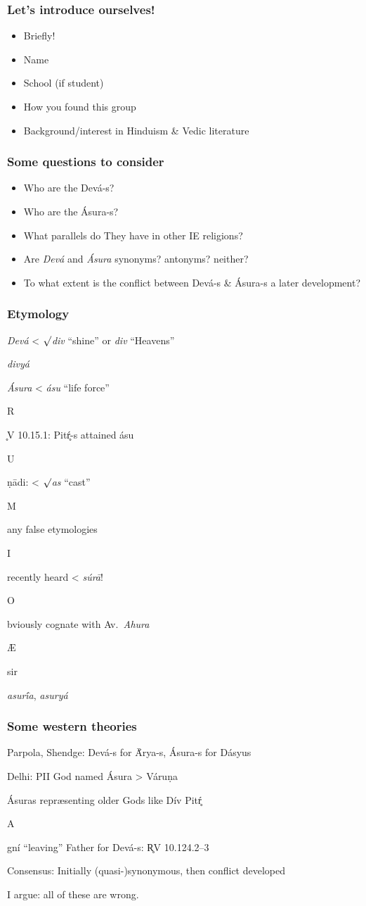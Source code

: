 \documentclass[pdf]{beamer}
\newcommand{\Subitem}[1]{{\setlength\itemindent{12pt} \item[-] #1}}
\newcommand{\Subsubitem}[1]{{\setlength\itemindent{24pt} \item[○] #1}}
\begin{document}
\begin{frame} \frametitle{Let's introduce ourselves!}
\begin{itemize}
	\item Briefly!
	\item Name
	\item School (if student)
	\item How you found this group
	\item Background/interest in Hinduism \& Vedic literature
\end{itemize}
\end{frame}

\begin{frame}[label=questions] \frametitle{Some questions to consider}
\begin{itemize}
	\item Who are the Devá-s?
	\item Who are the Ásura-s?
	\item What parallels do They have in other IE religions?
	\item Are \textit{Devá} and \textit{Ásura} synonyms? antonyms? neither?
	\item To what extent is the conflict between Devá-s \& Ásura-s a later development?
\end{itemize}
\end{frame}

\begin{frame} \frametitle{Etymology}
\begin{itemize}
	\item \textit{Devá} < $\surd$\textit{div} ``shine'' or \textit{div} ``Heavens''
	\Subitem {\textit{divyá}}
	\item \textit{Ásura} < \textit{ásu} ``life force''
	\Subitem R̥V 10.15.1: Pitŕ̥-s attained ásu
	\Subitem Uṇādi: < $\surd$\textit{as} ``cast''
	\Subitem Many false etymologies
	\Subsubitem I recently heard < \textit{súrā}!
	\Subitem Obviously cognate with Av.~\textit{Ahura}
	\Subsubitem Æsir
	\Subitem {\textit{asurī́a}, \textit{asuryá}}
\end{itemize}
\end{frame}

\begin{frame} \frametitle{Some western theories}
\begin{itemize}
	\item Parpola, Shendge: Devá-s for Ā́rya-s, Ásura-s for Dásyus
	\item Delhi: PII God named Ásura > Váruṇa
	\item Ásuras repræsenting older Gods like Dív Pitŕ̥
	\Subitem Agní ``leaving'' Father for Devá-s: R̥V 10.124.2--3
	\item Consensus: Initially (quasi-)synonymous, then conflict developed
	\item I argue: all of these are wrong.
\end{itemize}
\end{frame}
\end{document}
